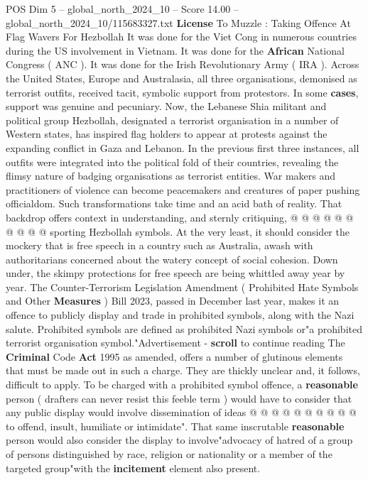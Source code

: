 \begin{textsample}{POS Dim 5 – global\_north\_2024\_10 – Score 14.00 – global\_north\_2024\_10/115683327.txt}  \label{ex:f5_pos_404}
\textbf{License} To Muzzle : Taking Offence At Flag Wavers For Hezbollah It was done for the Viet Cong in numerous countries during the US involvement in Vietnam.
It was done for the \textbf{African} National Congress ( ANC ).
It was done for the Irish Revolutionary Army ( IRA ).
Across the United States, Europe and Australasia, all three organisations, demonised as terrorist outfits, received tacit, symbolic support from protestors.
In some \textbf{cases}, support was genuine and pecuniary.
Now, the Lebanese Shia militant and political group Hezbollah, designated a terrorist organisation in a number of Western states, has inspired flag holders to appear at protests against the expanding conflict in Gaza and Lebanon.
In the previous first three instances, all outfits were integrated into the political fold of their countries, revealing the flimsy nature of badging organisations as terrorist entities.
War makers and practitioners of violence can become peacemakers and creatures of paper pushing officialdom.
Such transformations take time and an acid bath of reality.
That backdrop offers context in understanding, and sternly critiquing, @ @ @ @ @ @ @ @ @ @ sporting Hezbollah symbols.
At the very least, it should consider the mockery that is free speech in a country such as Australia, awash with authoritarians concerned about the watery concept of social cohesion.
Down under, the skimpy protections for free speech are being whittled away year by year.
The Counter-Terrorism Legislation Amendment ( Prohibited Hate Symbols and Other \textbf{Measures} ) Bill 2023, passed in December last year, makes it an offence to publicly display and trade in prohibited symbols, along with the Nazi salute.
Prohibited symbols are defined as prohibited Nazi symbols or"a prohibited terrorist organisation symbol."Advertisement - \textbf{scroll} to continue reading The \textbf{Criminal} Code \textbf{Act} 1995 as amended, offers a number of glutinous elements that must be made out in such a charge.
They are thickly unclear and, it follows, difficult to apply.
To be charged with a prohibited symbol offence, a \textbf{reasonable} person ( drafters can never resist this feeble term ) would have to consider that any public display would involve dissemination of ideas @ @ @ @ @ @ @ @ @ @ to offend, insult, humiliate or intimidate".
That same inscrutable \textbf{reasonable} person would also consider the display to involve"advocacy of hatred of a group of persons distinguished by race, religion or nationality or a member of the targeted group"with the \textbf{incitement} element also present.

\end{textsample}

